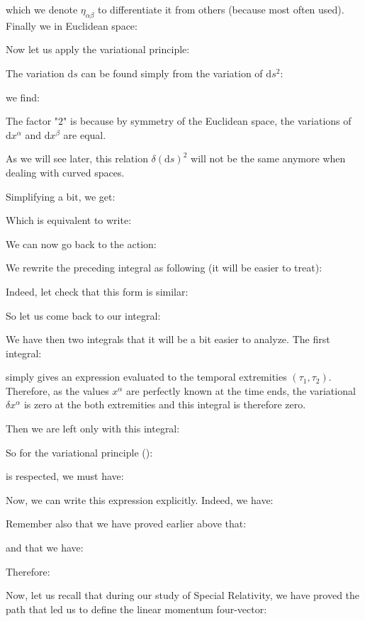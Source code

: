 	which we denote $\eta_{\alpha\beta}$ to differentiate it from others (because most often used). Finally we in Euclidean space:
	
	Now let us apply the variational principle:
	
	The variation $\mathrm{d}s$ can be found simply from the variation of $\mathrm{d}s^2$:
	
	we find:
	
	The factor "$2$" is because by symmetry of the Euclidean space, the variations of $\mathrm{d}x^\alpha$ and $\mathrm{d}x^\beta$ are equal. 
	\begin{tcolorbox}[title=Remark,colframe=black,arc=10pt]
	As we will see later, this relation $\delta(\mathrm{d}s)^2$ will not be the same anymore when dealing with curved spaces.
	\end{tcolorbox}
	Simplifying a bit, we get:
	
	Which is equivalent to write:
	
	We can now go back to the action:
	
	We rewrite the preceding integral as following (it will be easier to treat):
	
	Indeed, let check that this form is similar:
	
	So let us come back to our integral:
	
	We have then two integrals that it will be a bit easier to analyze. The first integral:
	
	simply gives an expression evaluated to the temporal extremities $(\tau_1,\tau_2)$. Therefore, as the values  $x^\alpha$ are perfectly known at the time ends, the variational $\delta x^\alpha$ is zero at the both extremities and this integral is therefore zero.
	
	Then we are left only with this integral:
	
	So for the variational principle ():
	 
	is respected, we must have:
	
	Now, we can write this expression explicitly. Indeed, we have:
	 
	Remember also that we have proved earlier above that:
	
	and that we have:
	
	Therefore:
	
	Now, let us recall that during our study of Special Relativity, we have proved the path that led us to define the linear momentum four-vector:
	
